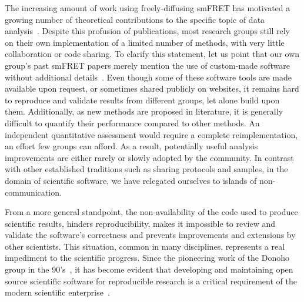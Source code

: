 \documentclass[10pt,letterpaper]{article}
\begin{document}
The increasing amount of work using freely-diffusing smFRET has motivated 
a growing number of theoretical contributions to the specific topic of data 
analysis~\cite{Fries_1998,Eggeling_2001,Zhang_2005,Gopich_2005,Lee_2005,Nir_2006,Antonik2006,Gopich_2007,Gopich_2008,Camley_2009,Santoso_2010,Torella_2011,Tomov_2012}. 
Despite this profusion of publications, most research groups still rely on 
their own implementation of a limited number of methods, with very little 
collaboration or code sharing. 
To clarify this statement, let us point that our own group's past smFRET papers 
merely mention the use of custom-made software without additional details~\cite{Lee_2005,Nir_2006}. 
Even though some of these software tools are made available upon request, 
or sometimes shared publicly on websites, 
it remains hard to reproduce and validate results from different groups, 
let alone build upon them.
Additionally, as new methods are proposed in literature,
it is generally difficult to quantify their performance compared to other methods.
An independent quantitative assessment
would require a complete reimplementation, an effort few groups can afford.
As a result, potentially useful analysis improvements
are either rarely or slowly adopted by the community.
In contrast with other established traditions such as
sharing protocols and samples, in the domain of scientific software,
we have relegated ourselves to islands of non-communication.

From a more general standpoint, the non-availability of the code
used to produce scientific results, hinders reproducibility,
makes it impossible to review and validate the software's correctness
and prevents improvements and extensions by other scientists.
This situation, common in many disciplines,
represents a real impediment to the scientific progress.
Since the pioneering work of the Donoho group in the 90's~\cite{Buckheit_1995},
it has become evident that developing and maintaining open source scientific software
for reproducible research is a critical requirement of the modern
scientific enterprise~\cite{Ince_2012,Vihinen_2015}.

\end{document}

